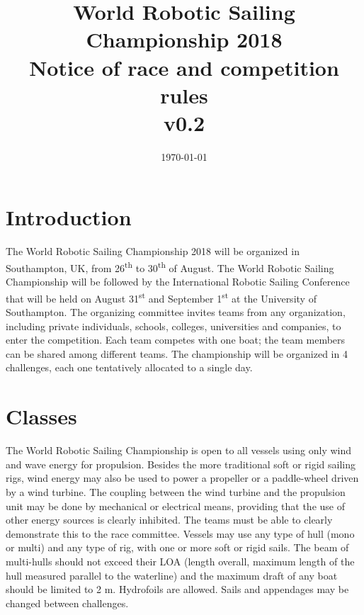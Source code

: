 \documentclass[12pt]{article}
\title{World Robotic Sailing Championship 2018 \\
Notice of race and competition rules \\v0.2}
\date{\today}
\begin{document}
\maketitle

\section{Introduction}

The World Robotic Sailing Championship 2018 will be organized in Southampton,
UK, from 26\textsuperscript{th} to 30\textsuperscript{th} of August.
The World Robotic Sailing Championship will be followed by
the International Robotic Sailing Conference that will be held on August
31\textsuperscript{st} and September 1\textsuperscript{st} at the University of
Southampton.
The organizing committee invites teams from any organization, including private
individuals, schools, colleges, universities and companies, to enter the competition. 
Each team competes with one boat; the team members can be shared among different teams. 
The championship will be organized in 4 challenges, each one tentatively allocated to a single day.

\section{Classes}

The World Robotic Sailing Championship is open to all vessels using 
only wind and wave energy for propulsion. 
Besides the more traditional soft or rigid sailing rigs, wind energy may also 
be used to power a propeller or a paddle-wheel driven by a wind turbine. 
The coupling between the wind turbine and the propulsion unit may be done by 
mechanical or electrical means, providing that the use of other energy sources
is clearly inhibited. The teams must be able to clearly demonstrate 
this to the race committee.
Vessels may use any type of hull (mono or multi) and any type of rig, with
one or more soft or rigid sails. The beam of multi-hulls should not exceed their 
LOA (length overall, maximum length of the hull measured parallel to the waterline) 
and the maximum draft of any boat should be limited to 2 m. 
Hydrofoils are allowed. Sails and appendages may be changed between challenges.
\end{document}
